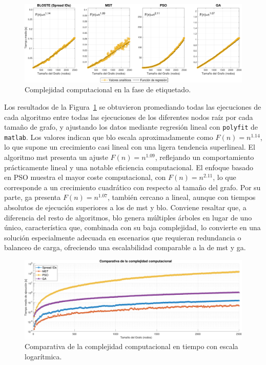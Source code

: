 \begin{figure}[ht!]
    \centering
    \includegraphics[width=\textwidth]{fig/07_bloste/bloste_23.pdf}
    \caption{Complejidad computacional en la fase de etiquetado.}
    \label{fig:comparison_4algorithms_linear_spread_ids}
\end{figure}

Los resultados de la Figura~\ref{fig:comparison_4algorithms_linear_spread_ids} se obtuvieron promediando todas las ejecuciones de cada algoritmo entre todas las ejecuciones de los diferentes nodos raíz por cada tamaño de grafo, y ajustando los datos mediante regresión lineal con \texttt{polyfit} de \texttt{matlab}. Los valores indican que \gls{blo} escala aproximadamente como \(F(n) = n^{1.14}\), lo que supone un crecimiento casi lineal con una ligera tendencia superlineal. El algoritmo \gls{mst} presenta un ajuste \(F(n) = n^{1.09}\), reflejando un comportamiento prácticamente lineal y una notable eficiencia computacional. El enfoque basado en PSO muestra el mayor coste computacional, con \(F(n) = n^{2.11}\), lo que corresponde a un crecimiento cuadrático con respecto al tamaño del grafo. Por su parte, \gls{ga} presenta \(F(n) = n^{1.07}\), también cercano a lineal, aunque con tiempos absolutos de ejecución superiores a los de \gls{mst} y \gls{blo}. Conviene resaltar que, a diferencia del resto de algoritmos, \gls{blo} genera múltiples árboles en lugar de uno único, característica que, combinada con su baja complejidad, lo convierte en una solución especialmente adecuada en escenarios que requieran redundancia o balanceo de carga, ofreciendo una escalabilidad comparable a la de \gls{mst} y \gls{ga}.  

\begin{figure}[ht!]
    \centering
    \includegraphics[width=\textwidth]{fig/07_bloste/bloste_24.pdf}
    \caption{Comparativa de la complejidad computacional en tiempo con escala logarítmica.}
    \label{fig:complexity_comparison_time_spread_ids}
\end{figure}


